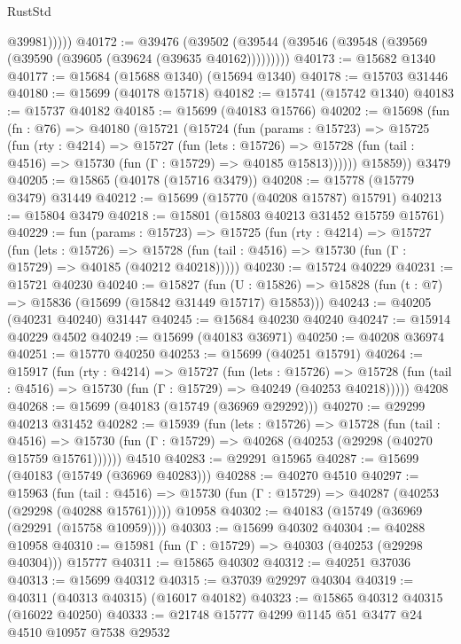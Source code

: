 \begin{lexlean}{RustStd}
\begin{coremodule}
              @39981)))))
@40172 := @39476
    (@39502 (@39544 (@39546 (@39548 (@39569 (@39590 (@39605 (@39624 (@39635 @40162)))))))))
@40173 := @15682 @1340
@40177 := @15684 (@15688 @1340) (@15694 @1340)
@40178 := @15703 @31446
@40180 := @15699 (@40178 @15718)
@40182 := @15741 (@15742 @1340)
@40183 := @15737 @40182
@40185 := @15699 (@40183 @15766)
@40202 := @15698
    (fun (fn : @76) =>
    @40180
      (@15721
        (@15724
          (fun (params : @15723) =>
          @15725
            (fun (rty : @4214) =>
            @15727
              (fun (lets : @15726) =>
              @15728 (fun (tail : @4516) => @15730 (fun (Γ : @15729) => @40185 @15813))))))
        @15859))
    @3479
@40205 := @15865 (@40178 (@15716 @3479))
@40208 := @15778 (@15779 @3479) @31449
@40212 := @15699 (@15770 (@40208 @15787) @15791)
@40213 := @15804 @3479
@40218 := @15801 (@15803 @40213 @31452 @15759 @15761)
@40229 := fun (params : @15723) =>
  @15725
    (fun (rty : @4214) =>
    @15727
      (fun (lets : @15726) =>
      @15728 (fun (tail : @4516) => @15730 (fun (Γ : @15729) => @40185 (@40212 @40218)))))
@40230 := @15724 @40229
@40231 := @15721 @40230
@40240 := @15827
    (fun (U : @15826) => @15828 (fun (t : @7) => @15836 (@15699 (@15842 @31449 @15717) @15853)))
@40243 := @40205 (@40231 @40240) @31447
@40245 := @15684 @40230 @40240
@40247 := @15914 @40229 @4502
@40249 := @15699 (@40183 @36971)
@40250 := @40208 @36974
@40251 := @15770 @40250
@40253 := @15699 (@40251 @15791)
@40264 := @15917
    (fun (rty : @4214) =>
    @15727
      (fun (lets : @15726) =>
      @15728 (fun (tail : @4516) => @15730 (fun (Γ : @15729) => @40249 (@40253 @40218)))))
    @4208
@40268 := @15699 (@40183 (@15749 (@36969 @29292)))
@40270 := @29299 @40213 @31452
@40282 := @15939
    (fun (lets : @15726) =>
    @15728
      (fun (tail : @4516) =>
      @15730 (fun (Γ : @15729) => @40268 (@40253 (@29298 (@40270 @15759 @15761))))))
    @4510
@40283 := @29291 @15965
@40287 := @15699 (@40183 (@15749 (@36969 @40283)))
@40288 := @40270 @4510
@40297 := @15963
    (fun (tail : @4516) => @15730 (fun (Γ : @15729) => @40287 (@40253 (@29298 (@40288 @15761)))))
    @10958
@40302 := @40183 (@15749 (@36969 (@29291 (@15758 @10959))))
@40303 := @15699 @40302
@40304 := @40288 @10958
@40310 := @15981 (fun (Γ : @15729) => @40303 (@40253 (@29298 @40304))) @15777
@40311 := @15865 @40302
@40312 := @40251 @37036
@40313 := @15699 @40312
@40315 := @37039 @29297 @40304
@40319 := @40311 (@40313 @40315) (@16017 @40182)
@40323 := @15865 @40312 @40315 (@16022 @40250)
@40333 := @21748 @15777 @4299 @1145 @51 @3477 @24 @4510 @10957 @7538 @29532

\end{coremodule}
\end{lexlean}
